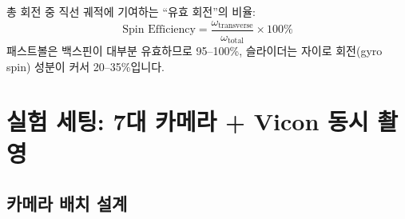 \documentclass[11pt, a4paper]{report}
\begin{document}
\begin{definition}
총 회전 중 직선 궤적에 기여하는 ``유효 회전''의 비율:
\begin{equation}
\text{Spin Efficiency} = \frac{\omega_{\text{transverse}}}{\omega_{\text{total}}} \times 100\%
\end{equation}
패스트볼은 백스핀이 대부분 유효하므로 95--100\%, 슬라이더는 자이로 회전(gyro spin) 성분이 커서 20--35\%입니다.
\end{definition}


\chapter{실험 세팅: 7대 카메라 + Vicon 동시 촬영}
\label{ch:setup}

\section{카메라 배치 설계}
\label{sec:camera_placement}
\end{document}
